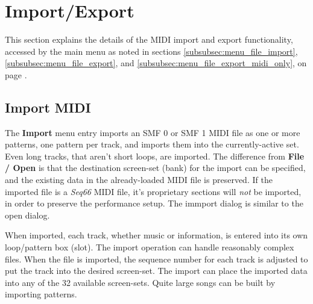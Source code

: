 %
%
%

\section{Import/Export}
\label{sec:midi_export}

   This section explains the details of the MIDI import and export
   functionality, accessed by the main menu as noted in sections
   \ref{subsubsec:menu_file_import},
   \ref{subsubsec:menu_file_export}, and
   \ref{subsubsec:menu_file_export_midi_only}, on page
   \pageref{subsubsec:menu_file_import}.

\subsection{Import MIDI}
\label{subsec:midi_export_file_import}

   The \textbf{Import} menu entry imports an SMF 0
   or SMF 1 MIDI file as one or more patterns, one pattern per track, and
   imports them into the currently-active set.
   Even long tracks, that aren't short loops, are imported.
   The difference from \textbf{File / Open} is that the destination screen-set
   (bank) for the import can be specified, and the existing data in the
   already-loaded MIDI file is preserved.
   If the imported file is a
   \textsl{Seq66} MIDI file, it's proprietary sections will
   \textsl{not} be imported, in order to preserve the performance setup.
   The immport dialog is similar to the open dialog.

   When imported, each track, whether music or information,
   is entered into its own loop/pattern box (slot).
   The import operation can handle reasonably complex files.
   When the file is imported, the sequence number for each track is
   adjusted to put the track into the desired screen-set.
   The import can place the imported data into any of the 32 available
   screen-sets.  Quite large songs can be built by importing patterns.

